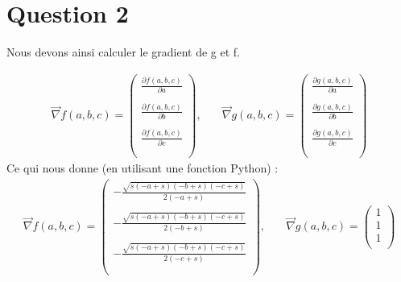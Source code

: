 \documentclass[12pt]{report}
\begin{document}
\section{Question 2}
Nous devons ainsi calculer le gradient de g et f.

\begin{align*}
\overrightarrow{\nabla}f(a,b,c) = 
\left(\begin{matrix}
\frac{\partial f(a,b,c)}{\partial a} \\ \\
\frac{\partial f(a,b,c)}{\partial b} \\ \\
\frac{\partial f(a,b,c)}{\partial c} \\ \\
\end{matrix}\right),\quad          &  \overrightarrow{\nabla}g(a,b,c) = 
\left(\begin{matrix}
\frac{\partial g(a,b,c)}{\partial a} \\ \\
\frac{\partial g(a,b,c)}{\partial b} \\ \\
\frac{\partial g(a,b,c)}{\partial c} \\ \\
\end{matrix}\right)      
\end{align*}
\indent Ce qui nous donne (en utilisant une fonction Python) :
\begin{align*}
\overrightarrow{\nabla}f(a,b,c) = 
\left(\begin{matrix}
- \frac{\sqrt{s \left(- a + s\right) \left(- b + s\right) \left(- c + s\right)}}{2 \left(- a + s\right)}\\ \\
- \frac{\sqrt{s \left(- a + s\right) \left(- b + s\right) \left(- c + s\right)}}{2 \left(- b + s\right)}\\ \\
- \frac{\sqrt{s \left(- a + s\right) \left(- b + s\right) \left(- c + s\right)}}{2 \left(- c + s\right)} \\ \\
\end{matrix}\right),\quad          &  \overrightarrow{\nabla}g(a,b,c) = 
\left(\begin{matrix}
1 \\ 
1 \\ 
1 \\ 
\end{matrix}\right)      
\end{align*}
\end{document}
